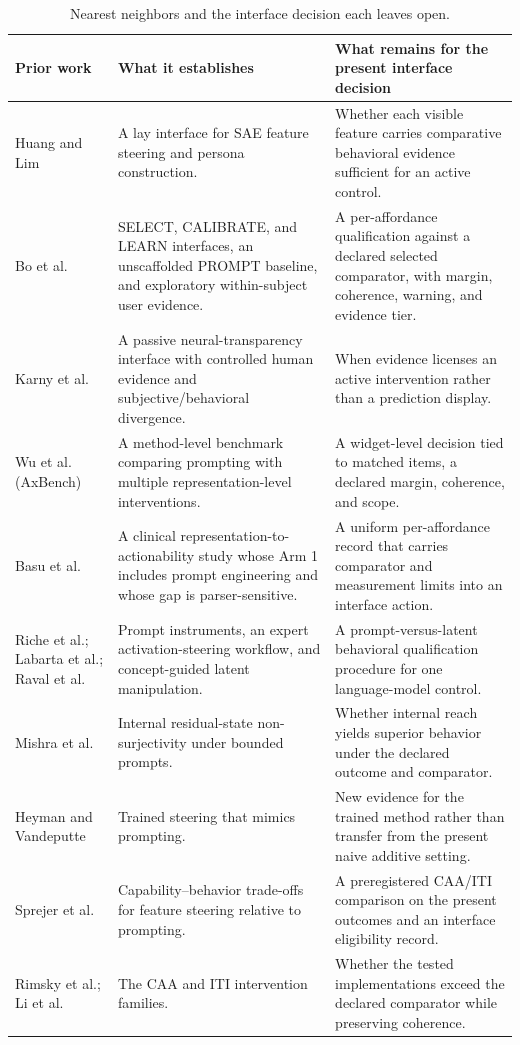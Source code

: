 \documentclass[manuscript,review,anonymous]{acmart}
\newcommand{\TopRule}{\toprule}
\begin{document}
\begin{table}[t]
\centering
\footnotesize
\setlength{\tabcolsep}{4pt}
\caption{Nearest neighbors and the interface decision each leaves open.}
\label{tab:novelty-neighbors}
\begin{tabular}{@{}p{}p{}p{}@{}}
\TopRule
Prior work & What it establishes & What remains for the present interface decision \\
\midrule
Huang and Lim \cite{huang2025steering} & A lay interface for SAE feature steering and persona construction. & Whether each visible feature carries comparative behavioral evidence sufficient for an active control. \\
Bo et al. \cite{bo2026steerable} & SELECT, CALIBRATE, and LEARN interfaces, an unscaffolded PROMPT baseline, and exploratory within-subject user evidence. & A per-affordance qualification against a declared selected comparator, with margin, coherence, warning, and evidence tier. \\
Karny et al. \cite{karny2026neural} & A passive neural-transparency interface with controlled human evidence and subjective/behavioral divergence. & When evidence licenses an active intervention rather than a prediction display. \\
Wu et al. (AxBench) \cite{wu2025axbench} & A method-level benchmark comparing prompting with multiple representation-level interventions. & A widget-level decision tied to matched items, a declared margin, coherence, and scope. \\
Basu et al. \cite{basu2026actionability} & A clinical representation-to-actionability study whose Arm 1 includes prompt engineering and whose gap is parser-sensitive. & A uniform per-affordance record that carries comparator and measurement limits into an interface action. \\
Riche et al.; Labarta et al.; Raval et al. \cite{riche2025aiinstr,labarta2026attribution,raval2026latman} & Prompt instruments, an expert activation-steering workflow, and concept-guided latent manipulation. & A prompt-versus-latent behavioral qualification procedure for one language-model control. \\
Mishra et al. \cite{mishra2026nonsurj} & Internal residual-state non-surjectivity under bounded prompts. & Whether internal reach yields superior behavior under the declared outcome and comparator. \\
Heyman and Vandeputte \cite{heyman2026steer} & Trained steering that mimics prompting. & New evidence for the trained method rather than transfer from the present naive additive setting. \\
Sprejer et al. \cite{sprejer2026mindgap} & Capability--behavior trade-offs for feature steering relative to prompting. & A preregistered CAA/ITI comparison on the present outcomes and an interface eligibility record. \\
Rimsky et al.; Li et al. \cite{rimsky2024caa,li2023iti} & The CAA and ITI intervention families. & Whether the tested implementations exceed the declared comparator while preserving coherence. \\
\bottomrule
\end{tabular}
\end{table}
\end{document}
